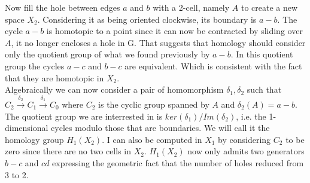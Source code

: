 \documentclass[12pt]{article}
\begin{document}
Now fill the hole between edges $a$ and $b$ with a 2-cell, namely $A$ to create a new space $X_2$. Considering it as being oriented clockwise, its boundary is $a-b$. The cycle $a-b$ is homotopic to a point since it can now be contracted by sliding over $A$, it no longer encloses a hole in G. That suggests that homology should consider only the quotient group of what we found previously by $a-b$. In this quotient group the cycles $a-c$ and $b-c$ are equivalent. Which is consistent with the fact that they are homotopic in $X_2$.\\

Algebraically we can now consider a pair of homomorphism $\delta_1, \delta_2$ such that $C_2 \xrightarrow{\delta_2} C_1 \xrightarrow{\delta_1} C_0$ where $C_2$ is the cyclic group spanned by $A$ and $\delta_2(A) = a-b$. The quotient group we are interrested in is $ker(\delta_1)/Im(\delta_2)$, i.e. the 1-dimensional cycles modulo those that are boundaries. We will call it the homology group $H_1(X_2)$. I can also be computed in $X_1$ by considering $C_2$ to be zero since there are no two cells in $X_2$. $H_1(X_2)$ now only admits two generators $b-c$ and $cd$ expressing the geometric fact that the number of holes reduced from 3 to 2.\\


\begin{center}
\end{center}
\end{document}
